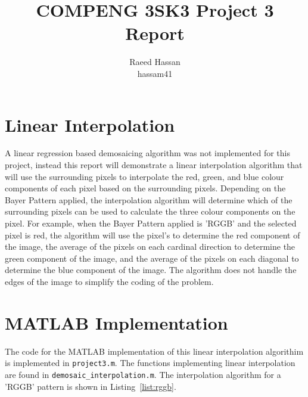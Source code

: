 \documentclass[12pt]{article}
\title{COMPENG 3SK3 Project 3 Report}
\author{
    Raeed Hassan \\
    hassam41 \\
}
\begin{document}
\maketitle
\clearpage

\section*{Linear Interpolation}
A linear regression based demosaicing algorithm was not implemented for this project, instead this report will demonstrate a linear interpolation algorithm that will use the surrounding pixels to interpolate the red, green, and blue colour components of each pixel based on the surrounding pixels. Depending on the Bayer Pattern applied, the interpolation algorithm will determine which of the surrounding pixels can be used to calculate the three colour components on the pixel. For example, when the Bayer Pattern applied is 'RGGB' and the selected pixel is red, the algorithm will use the pixel's to determine the red component of the image, the average of the pixels on each cardinal direction to determine the green component of the image, and the average of the pixels on each diagonal to determine the blue component of the image. The algorithm does not handle the edges of the image to simplify the coding of the problem.

\section*{MATLAB Implementation}
The code for the MATLAB implementation of this linear interpolation algorithim is implemented in \texttt{project3.m}. The functions implementing linear interpolation are found in \texttt{demosaic\_interpolation.m}. The interpolation algorithm for a 'RGGB' pattern is shown in Listing~\ref{list:rggb}.
\end{document}
